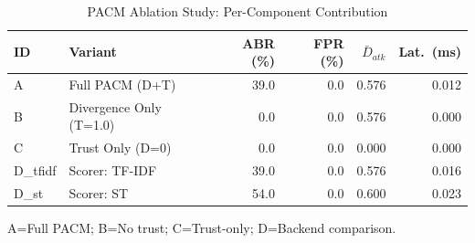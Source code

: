 \begin{table}[htbp]
  \centering \small
  \caption{PACM Ablation Study: Per-Component Contribution}
  \label{tab:ablation}
  \begin{tabular}{llrrrr}
    \toprule
    ID & Variant & ABR (\%) & FPR (\%) & $\bar{D}_{atk}$ & Lat.\ (ms) \\
    \midrule
    A & Full PACM (D+T) & 39.0 & 0.0 & 0.576 & 0.012 \\
    B & Divergence Only (T=1.0) & 0.0 & 0.0 & 0.576 & 0.000 \\
    C & Trust Only (D=0) & 0.0 & 0.0 & 0.000 & 0.000 \\
    D_tfidf & Scorer: TF-IDF & 39.0 & 0.0 & 0.576 & 0.016 \\
    D_st & Scorer: ST & 54.0 & 0.0 & 0.600 & 0.023 \\
    \bottomrule
  \end{tabular}
  \begin{tablenotes}
    \small
    \item A=Full PACM; B=No trust; C=Trust-only; D=Backend comparison.
  \end{tablenotes}
\end{table}
